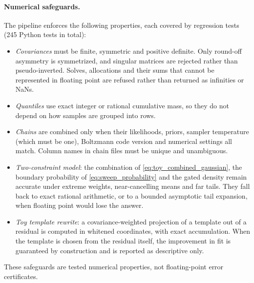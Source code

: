 \paragraph{Numerical safeguards.}
The pipeline enforces the following properties, each covered by regression tests (245 Python tests in total):
\begin{itemize}[leftmargin=*, itemsep=1pt]
  \item \emph{Covariances} must be finite, symmetric and positive definite. Only round-off asymmetry is symmetrized, and singular matrices are rejected rather than pseudo-inverted. Solves, allocations and their sums that cannot be represented in floating point are refused rather than returned as infinities or NaNs.
  \item \emph{Quantiles} use exact integer or rational cumulative mass, so they do not depend on how samples are grouped into rows.
  \item \emph{Chains} are combined only when their likelihoods, priors, sampler temperature (which must be one), Boltzmann code version and numerical settings all match. Column names in chain files must be unique and unambiguous.
  \item \emph{Two-constraint model}: the combination of \cref{eq:toy_combined_gaussian}, the boundary probability of \cref{eq:sweep_probability} and the gated density remain accurate under extreme weights, near-cancelling means and far tails. They fall back to exact rational arithmetic, or to a bounded asymptotic tail expansion, when floating point would lose the answer.
  \item \emph{Toy template rewrite}: a covariance-weighted projection of a template out of a residual is computed in whitened coordinates, with exact accumulation. When the template is chosen from the residual itself, the improvement in fit is guaranteed by construction and is reported as descriptive only.
\end{itemize}
These safeguards are tested numerical properties, not floating-point error certificates.
